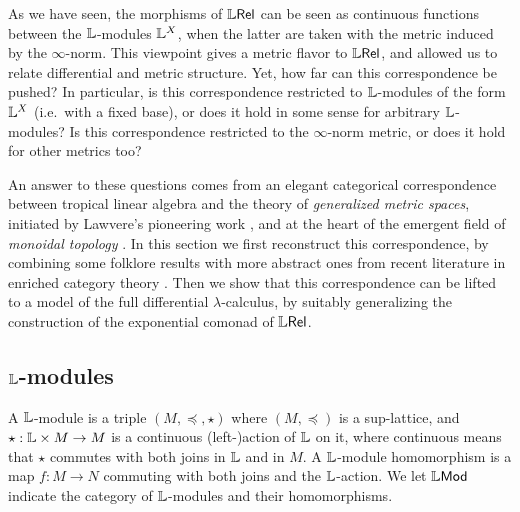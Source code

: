

As we have seen, the morphisms of $\mathbb{L} \mathsf{Rel}$ can be seen as continuous functions between the $\mathbb{L}$-modules $\mathbb{L}^{X}$, when the latter are taken with the metric induced by the $\infty$-norm. This viewpoint gives a metric flavor to $\mathbb{L} \mathsf{Rel}$, and allowed us to relate differential and metric structure. Yet, how far can this correspondence be pushed?
In particular, is this correspondence restricted to $\mathbb{L}$-modules of the form $\mathbb{L}^{X}$ (i.e.~with a fixed base), or does it hold in some sense for arbitrary $\mathbb{L}$-modules? Is this correspondence restricted to the $\infty$-norm metric, or does it hold for other metrics too?

An answer to these questions comes from an elegant categorical correspondence between tropical linear algebra and the theory of \emph{generalized metric spaces}, initiated by Lawvere's pioneering work \cite{Lawvere1973}, and at the heart of the emergent field of \emph{monoidal topology} \cite{Hofmann2014, Stubbe2014}. 
In this section we first reconstruct this correspondence, by combining some {folklore} results with more abstract ones from recent literature in enriched category theory \cite{Fuji, Stubbe2006, Shen2014}. Then we show that this correspondence can be lifted to a model of the full differential $\lambda$-calculus, by suitably generalizing the construction of the exponential comonad of $\mathbb{L} \mathsf{Rel}$.

%
%

\subsection{$\mathbb{L}$-modules}


A $\mathbb{L}$-module is a triple $(M,\preceq, \star)$ where $(M, \preceq)$ is a sup-lattice, and $\star: \mathbb{L} \times M \to M$ is a continuous (left-)action of $\mathbb{L}$ on it, where continuous means that $\star$ commutes with both joins in $\mathbb{L}$ and in $M$.%
A $\mathbb{L}$-module homomorphism is a map $f:M\to N$ commuting with both joins and the $\mathbb{L}$-action. We let $\mathbb{L}\mathsf{Mod}$ indicate the category of $\mathbb{L}$-modules and their homomorphisms. 
 
 
 


